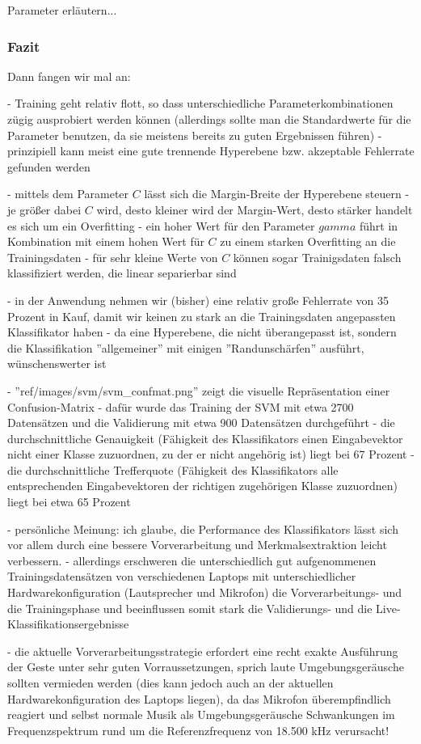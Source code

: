 Parameter erläutern...

\subsubsection{Fazit}
Dann fangen wir mal an:

- Training geht relativ flott, so dass unterschiedliche Parameterkombinationen zügig ausprobiert werden können (allerdings sollte man die Standardwerte für die Parameter benutzen, da sie meistens bereits zu guten Ergebnissen führen)
- prinzipiell kann meist eine gute trennende Hyperebene bzw. akzeptable Fehlerrate gefunden werden

- mittels dem Parameter $C$ lässt sich die Margin-Breite der Hyperebene steuern
- je größer dabei $C$ wird, desto kleiner wird der Margin-Wert, desto stärker handelt es sich um ein Overfitting
- ein hoher Wert für den Parameter $gamma$ führt in Kombination mit einem hohen Wert für $C$ zu einem starken Overfitting an die Trainingsdaten
- für sehr kleine Werte von $C$ können sogar Trainigsdaten falsch klassifiziert werden, die linear separierbar sind

- in der Anwendung nehmen wir (bisher) eine relativ große Fehlerrate von 35 Prozent in Kauf, damit wir keinen zu stark an die Trainingsdaten angepassten Klassifikator haben
- da eine Hyperebene, die nicht überangepasst ist, sondern die Klassifikation ''allgemeiner'' mit einigen ''Randunschärfen'' ausführt, wünschenswerter ist

- ''ref/images/svm/svm\_confmat.png'' zeigt die visuelle Repräsentation einer Confusion-Matrix
- dafür wurde das Training der SVM mit etwa 2700 Datensätzen und die Validierung mit etwa 900 Datensätzen durchgeführt
- die durchschnittliche Genauigkeit (Fähigkeit des Klassifikators einen Eingabevektor nicht einer Klasse zuzuordnen, zu der er nicht angehörig ist) liegt bei 67 Prozent
- die durchschnittliche Trefferquote (Fähigkeit des Klassifikators alle entsprechenden Eingabevektoren der richtigen zugehörigen Klasse zuzuordnen) liegt bei etwa 65 Prozent

- persönliche Meinung: ich glaube, die Performance des Klassifikators lässt sich vor allem durch eine bessere Vorverarbeitung und Merkmalsextraktion leicht verbessern.
- allerdings erschweren die unterschiedlich gut aufgenommenen Trainingsdatensätzen von verschiedenen Laptops mit unterschiedlicher Hardwarekonfiguration (Lautsprecher und Mikrofon) die Vorverarbeitungs- und die Trainingsphase und beeinflussen somit stark die Validierungs- und die Live-Klassifikationsergebnisse

- die aktuelle Vorverarbeitungsstrategie erfordert eine recht exakte Ausführung der Geste unter sehr guten Vorraussetzungen, sprich laute Umgebungsgeräusche sollten vermieden werden (dies kann jedoch auch an der aktuellen Hardwarekonfiguration des Laptops liegen), da das Mikrofon überempfindlich reagiert und selbst normale Musik als Umgebungsgeräusche Schwankungen im Frequenzspektrum rund um die Referenzfrequenz von 18.500 kHz verursacht!
